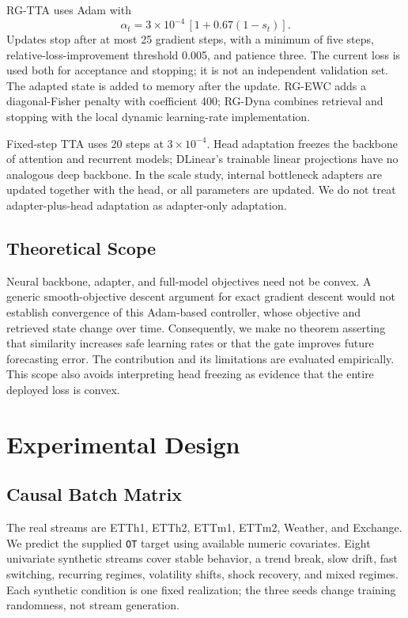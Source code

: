 \documentclass[conference]{IEEEtran}
\begin{document}
RG-TTA uses Adam with
\begin{equation}
 \alpha_t=3\!\times\!10^{-4}\,[1+0.67(1-s_t)].
\end{equation}
Updates stop after at most 25 gradient steps, with a minimum of five steps, relative-loss-improvement threshold 0.005, and patience three. The current loss is used both for acceptance and stopping; it is not an independent validation set. The adapted state is added to memory after the update. RG-EWC adds a diagonal-Fisher penalty with coefficient 400; RG-Dyna combines retrieval and stopping with the local dynamic learning-rate implementation.

Fixed-step TTA uses 20 steps at $3\times10^{-4}$. Head adaptation freezes the backbone of attention and recurrent models; DLinear's trainable linear projections have no analogous deep backbone. In the scale study, internal bottleneck adapters are updated together with the head, or all parameters are updated. We do not treat adapter-plus-head adaptation as adapter-only adaptation.

\subsection{Theoretical Scope}
Neural backbone, adapter, and full-model objectives need not be convex. A generic smooth-objective descent argument for exact gradient descent would not establish convergence of this Adam-based controller, whose objective and retrieved state change over time. Consequently, we make no theorem asserting that similarity increases safe learning rates or that the gate improves future forecasting error. The contribution and its limitations are evaluated empirically. This scope also avoids interpreting head freezing as evidence that the entire deployed loss is convex.

\section{Experimental Design}
\subsection{Causal Batch Matrix}
The real streams are ETTh1, ETTh2, ETTm1, ETTm2, Weather, and Exchange. We predict the supplied \texttt{OT} target using available numeric covariates. Eight univariate synthetic streams cover stable behavior, a trend break, slow drift, fast switching, recurring regimes, volatility shifts, shock recovery, and mixed regimes. Each synthetic condition is one fixed realization; the three seeds change training randomness, not stream generation.
\end{document}
